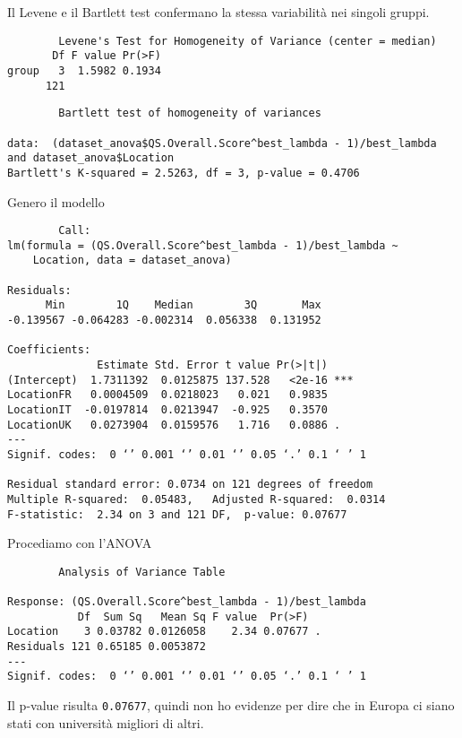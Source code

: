 \documentclass{beamer}
\begin{document}
\begin{frame}[fragile]
    Il Levene e il Bartlett test confermano la stessa variabilità nei singoli gruppi.
    {\tiny
    \begin{verbatim}
        Levene's Test for Homogeneity of Variance (center = median)
       Df F value Pr(>F)
group   3  1.5982 0.1934
      121
    \end{verbatim}
    }
    {\tiny
    \begin{verbatim}
        Bartlett test of homogeneity of variances

data:  (dataset_anova$QS.Overall.Score^best_lambda - 1)/best_lambda and dataset_anova$Location
Bartlett's K-squared = 2.5263, df = 3, p-value = 0.4706
    \end{verbatim}
    }
\end{frame}

\begin{frame}[fragile]
	Genero il modello
	{\tiny
	\begin{verbatim}
		Call:
lm(formula = (QS.Overall.Score^best_lambda - 1)/best_lambda ~ 
    Location, data = dataset_anova)

Residuals:
      Min        1Q    Median        3Q       Max 
-0.139567 -0.064283 -0.002314  0.056338  0.131952 

Coefficients:
              Estimate Std. Error t value Pr(>|t|)    
(Intercept)  1.7311392  0.0125875 137.528   <2e-16 ***
LocationFR   0.0004509  0.0218023   0.021   0.9835    
LocationIT  -0.0197814  0.0213947  -0.925   0.3570    
LocationUK   0.0273904  0.0159576   1.716   0.0886 .  
---
Signif. codes:  0 ‘’ 0.001 ‘’ 0.01 ‘’ 0.05 ‘.’ 0.1 ‘ ’ 1

Residual standard error: 0.0734 on 121 degrees of freedom
Multiple R-squared:  0.05483,	Adjusted R-squared:  0.0314 
F-statistic:  2.34 on 3 and 121 DF,  p-value: 0.07677
	\end{verbatim}
	}
\end{frame}

\begin{frame}[fragile]
    Procediamo con l'ANOVA
    {\tiny
    \begin{verbatim}
        Analysis of Variance Table

Response: (QS.Overall.Score^best_lambda - 1)/best_lambda
           Df  Sum Sq   Mean Sq F value  Pr(>F)  
Location    3 0.03782 0.0126058    2.34 0.07677 .
Residuals 121 0.65185 0.0053872                  
---
Signif. codes:  0 ‘’ 0.001 ‘’ 0.01 ‘’ 0.05 ‘.’ 0.1 ‘ ’ 1

    \end{verbatim}
    }
    Il p-value risulta \texttt{0.07677}, quindi non ho evidenze per dire che in Europa ci siano stati con università migliori di altri.
\end{frame}
\end{document}
